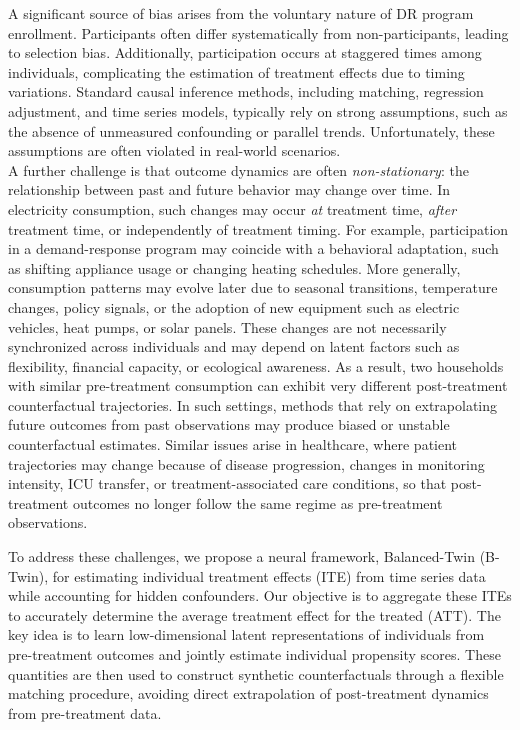 \documentclass[10pt]{article} %
\begin{document}
A significant source of bias arises from the voluntary nature of DR program enrollment. Participants often differ systematically from non-participants, leading to selection bias. Additionally, participation occurs at staggered times among individuals, complicating the estimation of treatment effects due to timing variations. Standard causal inference methods, including matching, regression adjustment, and time series models, typically rely on strong assumptions, such as the absence of unmeasured confounding or parallel trends. Unfortunately, these assumptions are often violated in real-world scenarios.\\
{A further challenge is that outcome dynamics are often \emph{non-stationary}: the relationship between past and future behavior may change over time. In electricity consumption, such changes may occur \emph{at} treatment time, \emph{after} treatment time, or independently of treatment timing. For example, participation in a demand-response program may coincide with a behavioral adaptation, such as shifting appliance usage or changing heating schedules. More generally, consumption patterns may evolve later due to seasonal transitions, temperature changes, policy signals, or the adoption of new equipment such as electric vehicles, heat pumps, or solar panels. These changes are not necessarily synchronized across individuals and may depend on latent factors such as flexibility, financial capacity, or ecological awareness. As a result, two households with similar pre-treatment consumption can exhibit very different post-treatment counterfactual trajectories. In such settings, methods that rely on extrapolating future outcomes from past observations may produce biased or unstable counterfactual estimates. Similar issues arise in healthcare, where patient trajectories may change because of disease progression, changes in monitoring intensity, ICU transfer, or treatment-associated care conditions, so that post-treatment outcomes no longer follow the same regime as pre-treatment observations.}

To address these challenges, we propose a neural framework, Balanced-Twin (B-Twin), for estimating individual treatment effects (ITE) from time series data while accounting for hidden confounders. Our objective is to aggregate these ITEs to accurately determine the average treatment effect for the treated (ATT). The key idea is to learn low-dimensional latent representations of individuals from pre-treatment outcomes and jointly estimate individual propensity scores. These quantities are then used to construct synthetic counterfactuals through a flexible matching procedure, {avoiding direct extrapolation of post-treatment dynamics from pre-treatment data}.
\end{document}
